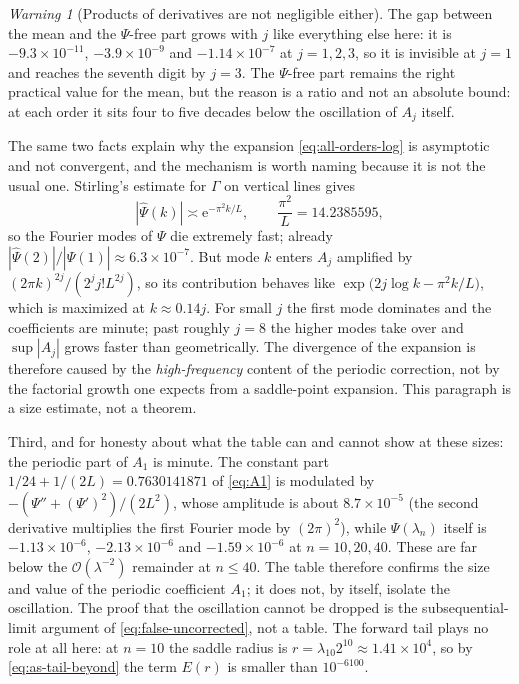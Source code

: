 \documentclass[11pt,oneside]{article}
\theoremstyle{definition}
\theoremstyle{remark}
\newtheorem{warning}[theorem]{Warning}
\newcommand{\e}{\mathrm e}
\newcommand{\bigO}{\mathcal O}
\begin{document}
\begin{warning}[Products of derivatives are not negligible either]
The gap between the mean and the $\Psi$-free part grows with $j$ like everything else here:
it is $-9.3\times10^{-11}$, $-3.9\times10^{-9}$ and $-1.14\times10^{-7}$ at $j=1,2,3$, so it
is invisible at $j=1$ and reaches the seventh digit by $j=3$.  The $\Psi$-free part remains
the right practical value for the mean, but the reason is a ratio and not an absolute bound:
at each order it sits four to five decades below the oscillation of $A_j$ itself.
\end{warning}

The same two facts explain why the expansion \eqref{eq:all-orders-log} is asymptotic and not
convergent, and the mechanism is worth naming because it is not the usual one.  Stirling's
estimate for $\Gamma$ on vertical lines gives
\begin{equation}
 |\widehat\Psi(k)|\asymp\e^{-\pi^{2}k/L},
 \qquad \frac{\pi^{2}}{L}=14.2385595,                      \label{eq:as-mode-decay}
\end{equation}
so the Fourier modes of $\Psi$ die extremely fast; already
$|\widehat\Psi(2)|/|\widehat\Psi(1)|\approx6.3\times10^{-7}$.  But mode $k$ enters $A_j$
amplified by $(2\pi k)^{2j}/(2^{j}j!L^{2j})$, so its contribution behaves like
$\exp\bigl(2j\log k-\pi^{2}k/L\bigr)$, which is maximized at $k\approx0.14j$.  For small $j$
the first mode dominates and the coefficients are minute; past roughly $j=8$ the higher modes
take over and $\sup|A_j|$ grows faster than geometrically.  The divergence of the expansion is
therefore caused by the \emph{high-frequency} content of the periodic correction, not by the
factorial growth one expects from a saddle-point expansion.  This paragraph is a size
estimate, not a theorem.

Third, and for honesty about what the table can and cannot show at these sizes: the periodic
part of $A_1$ is minute.  The constant part $1/24+1/(2L)=0.7630141871$ of \eqref{eq:A1} is
modulated by $-(\Psi''+(\Psi')^{2})/(2L^{2})$, whose amplitude is about $8.7\times10^{-5}$
(the second derivative multiplies the first Fourier mode by $(2\pi)^{2}$),
while $\Psi(\lambda_n)$ itself is $-1.13\times10^{-6}$, $-2.13\times10^{-6}$ and
$-1.59\times10^{-6}$ at $n=10,20,40$.  These are far below the $\bigO(\lambda^{-2})$
remainder at $n\le40$.  The table therefore confirms the size and value of the periodic
coefficient $A_1$; it does not, by itself, isolate the oscillation.  The proof that the
oscillation cannot be dropped is the subsequential-limit argument of
\eqref{eq:false-uncorrected}, not a table.  The forward tail plays no role at all here: at
$n=10$ the saddle radius is $r=\lambda_{10}2^{10}\approx1.41\times10^{4}$, so by
\eqref{eq:as-tail-beyond} the term $E(r)$ is smaller than $10^{-6100}$.
\end{document}
